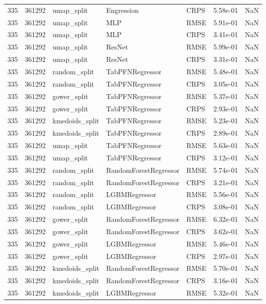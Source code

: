 \begin{tabular}{rrlllrr}
335 & 361292 & umap\_split & Engression & CRPS & 5.58e-01 & NaN \\
335 & 361292 & umap\_split & MLP & RMSE & 5.91e-01 & NaN \\
335 & 361292 & umap\_split & MLP & CRPS & 3.41e-01 & NaN \\
335 & 361292 & umap\_split & ResNet & RMSE & 5.99e-01 & NaN \\
335 & 361292 & umap\_split & ResNet & CRPS & 3.31e-01 & NaN \\
335 & 361292 & random\_split & TabPFNRegressor & RMSE & 5.48e-01 & NaN \\
335 & 361292 & random\_split & TabPFNRegressor & CRPS & 3.05e-01 & NaN \\
335 & 361292 & gower\_split & TabPFNRegressor & RMSE & 5.37e-01 & NaN \\
335 & 361292 & gower\_split & TabPFNRegressor & CRPS & 2.93e-01 & NaN \\
335 & 361292 & kmedoids\_split & TabPFNRegressor & RMSE & 5.23e-01 & NaN \\
335 & 361292 & kmedoids\_split & TabPFNRegressor & CRPS & 2.89e-01 & NaN \\
335 & 361292 & umap\_split & TabPFNRegressor & RMSE & 5.63e-01 & NaN \\
335 & 361292 & umap\_split & TabPFNRegressor & CRPS & 3.12e-01 & NaN \\
335 & 361292 & random\_split & RandomForestRegressor & RMSE & 5.74e-01 & NaN \\
335 & 361292 & random\_split & RandomForestRegressor & CRPS & 3.21e-01 & NaN \\
335 & 361292 & random\_split & LGBMRegressor & RMSE & 5.56e-01 & NaN \\
335 & 361292 & random\_split & LGBMRegressor & CRPS & 3.08e-01 & NaN \\
335 & 361292 & gower\_split & RandomForestRegressor & RMSE & 6.32e-01 & NaN \\
335 & 361292 & gower\_split & RandomForestRegressor & CRPS & 3.62e-01 & NaN \\
335 & 361292 & gower\_split & LGBMRegressor & RMSE & 5.46e-01 & NaN \\
335 & 361292 & gower\_split & LGBMRegressor & CRPS & 2.97e-01 & NaN \\
335 & 361292 & kmedoids\_split & RandomForestRegressor & RMSE & 5.70e-01 & NaN \\
335 & 361292 & kmedoids\_split & RandomForestRegressor & CRPS & 3.16e-01 & NaN \\
335 & 361292 & kmedoids\_split & LGBMRegressor & RMSE & 5.32e-01 & NaN \\

\end{tabular}
